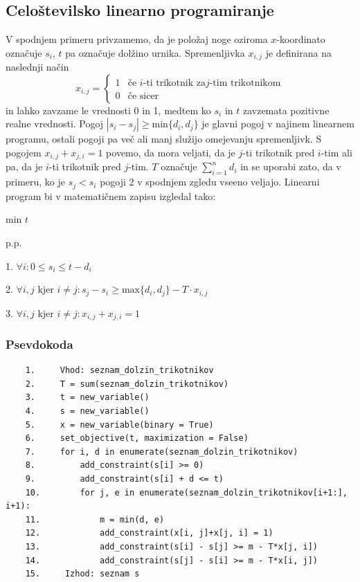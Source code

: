 \documentclass[a4paper,12pt]{article}
\theoremstyle{definition}
\theoremstyle{plain}
\begin{document}
\subsection{Celoštevilsko linearno programiranje}
V spodnjem primeru privzamemo, da je položaj noge oziroma $x$-koordinato označuje $s_i$, $t$ pa označuje dolžino urnika. Spremenljivka $x_{i,j}$ je definirana na naslednji način
$$
x_{i,j} =
\left\{
	\begin{array}{ll}
		1  & \mbox{če } i\text{-ti trikotnik za} j\text{-tim trikotnikom} \\
		0  & \mbox{če } \text{sicer}
	\end{array}
\right.
$$
in lahko zavzame le vrednosti 0 in 1, medtem ko $s_i$ in $t$ zavzemata pozitivne realne vrednosti. Pogoj $|s_i-s_j| \geq \text{min}\{d_i,d_j\}$ je glavni pogoj v najinem linearnem programu, ostali pogoji pa več ali manj služijo omejevanju spremenljivk.
S pogojem $x_{i,j}+x_{j,i}=1$ povemo, da mora veljati, da je $j$-ti trikotnik pred $i$-tim ali pa, da je $i$-ti trikotnik pred $j$-tim.
$T$ označuje $\sum_{i=1}^n d_i$ in se uporabi zato, da v primeru, ko je $s_j < s_i$ pogoji 2 v spodnjem zgledu vseeno veljajo.
Linearni program bi v matematičnem zapisu izgledal tako:
\begin{center}
    min $t$

    p.p.

    1.  $\forall i: 0 \leq s_i \leq t-d_i$

    \medskip

    2.  $\forall i,j \text{ kjer } i\neq j: s_j - s_i \geq \text{max}\{d_i,d_j\}-T\cdot x_{i,j}$
    \medskip

    3.  $\forall i,j \text{ kjer } i\neq j: x_{i,j}+x_{j,i}=1$
\end{center}
\subsubsection{Psevdokoda}
\begin{verbatim}
    1.     Vhod: seznam_dolzin_trikotnikov
    2.     T = sum(seznam_dolzin_trikotnikov)
    3.     t = new_variable()
    4.     s = new_variable()
    5.     x = new_variable(binary = True)
    6.     set_objective(t, maximization = False)
    7.     for i, d in enumerate(seznam_dolzin_trikotnikov)
    8.         add_constraint(s[i] >= 0)
    9.         add_constraint(s[i] + d <= t)
    10.        for j, e in enumerate(seznam_dolzin_trikotnikov[i+1:], i+1):
    11.            m = min(d, e)
    12.            add_constraint(x[i, j]+x[j, i] = 1)
    13.            add_constraint(s[i] - s[j] >= m - T*x[j, i])
    14.            add_constraint(s[j] - s[i] >= m - T*x[i, j])
    15.     Izhod: seznam s
\end{verbatim}
\end{document}

